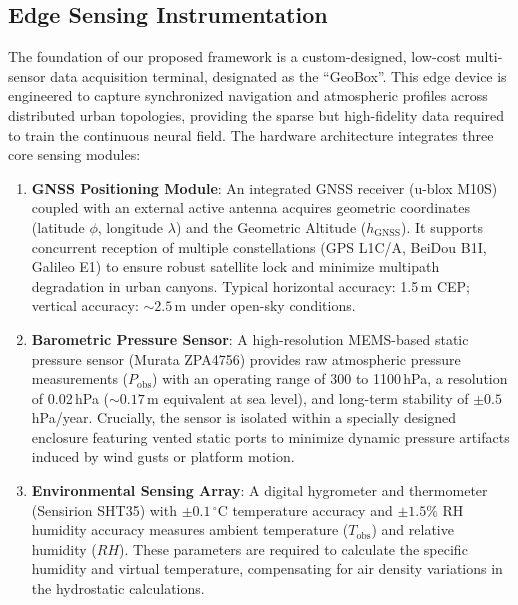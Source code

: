 \subsection{Edge Sensing Instrumentation}
\label{subsec:hardware}
The foundation of our proposed framework is a custom-designed, low-cost multi-sensor data acquisition terminal, designated as the ``GeoBox''. This edge device is engineered to capture synchronized navigation and atmospheric profiles across distributed urban topologies, providing the sparse but high-fidelity data required to train the continuous neural field. The hardware architecture integrates three core sensing modules:
\begin{enumerate}
    \item \textbf{GNSS Positioning Module}: An integrated GNSS receiver (u-blox M10S) coupled with an external active antenna acquires geometric coordinates (latitude $\phi$, longitude $\lambda$) and the Geometric Altitude ($h_\text{GNSS}$). It supports concurrent reception of multiple constellations (GPS L1C/A, BeiDou B1I, Galileo E1) to ensure robust satellite lock and minimize multipath degradation in urban canyons. Typical horizontal accuracy: 1.5\,m CEP; vertical accuracy: ${\sim}2.5$\,m under open-sky conditions.
    \item \textbf{Barometric Pressure Sensor}: A high-resolution MEMS-based static pressure sensor (Murata ZPA4756) provides raw atmospheric pressure measurements ($P_\text{obs}$) with an operating range of 300 to 1100\,hPa, a resolution of 0.02\,hPa (${\sim}0.17$\,m equivalent at sea level), and long-term stability of $\pm0.5$\,hPa/year. Crucially, the sensor is isolated within a specially designed enclosure featuring vented static ports to minimize dynamic pressure artifacts induced by wind gusts or platform motion.
    \item \textbf{Environmental Sensing Array}: A digital hygrometer and thermometer (Sensirion SHT35) with $\pm0.1\,^{\circ}$C temperature accuracy and $\pm1.5\%$ RH humidity accuracy measures ambient temperature ($T_\text{obs}$) and relative humidity ($RH$). These parameters are required to calculate the specific humidity and virtual temperature, compensating for air density variations in the hydrostatic calculations.
\end{enumerate}

